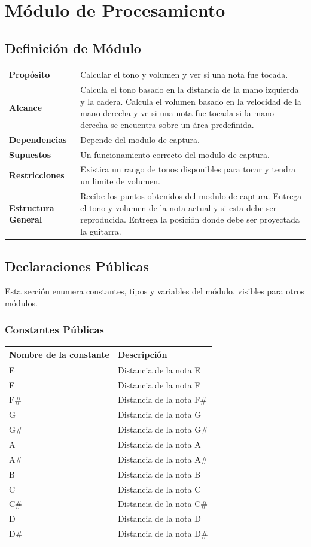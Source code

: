 \documentclass[a4paper,10pt]{article}
\begin{document}
\section{Módulo de Procesamiento}
\label{sec:procesamiento}
\subsection{Definición de Módulo}
\begin{tabularx}{\textwidth}{p{25mm} X}
        \textbf{Propósito} & Calcular el tono y volumen y ver si una nota fue tocada.\\
        \textbf{Alcance} & Calcula el tono basado en la distancia de la mano izquierda y la cadera. Calcula el volumen basado en la velocidad de la mano derecha y ve si una nota fue tocada si la mano derecha se encuentra sobre un área predefinida.\\
        \textbf{Dependencias} & Depende del modulo de captura.\\
        \textbf{Supuestos} & Un funcionamiento correcto del modulo de captura.\\
        \textbf{Restricciones} & Existira un rango de tonos disponibles para tocar y tendra un limite de volumen.\\
        \textbf{Estructura General} & Recibe los puntos obtenidos del modulo de captura. Entrega el tono y volumen de la nota actual y si esta debe ser reproducida. Entrega la posición donde debe ser proyectada la guitarra. \\
\end{tabularx}
\subsection{Declaraciones Públicas}
Esta sección enumera constantes, tipos y variables del módulo, visibles para
otros módulos.
\subsubsection{Constantes Públicas}
\begin{tabular}{| p{30mm} | p{10cm} |}
        \hline
        \textbf{Nombre de la \mbox{constante}} & \textbf{Descripción} \\
        \hline
        E & Distancia de la nota E\\
        F & Distancia de la nota F\\
        F\# & Distancia de la nota F\#\\
        G & Distancia de la nota G\\
        G\# & Distancia de la nota G\#\\
        A & Distancia de la nota A\\
        A\# & Distancia de la nota A\#\\
        B & Distancia de la nota B\\
        C & Distancia de la nota C\\
        C\# & Distancia de la nota C\#\\
        D & Distancia de la nota D\\
        D\# & Distancia de la nota D\#\\
        \hline
\end{tabular}
\end{document}

